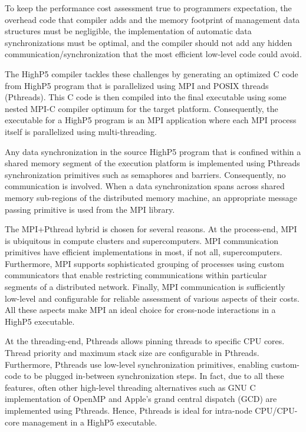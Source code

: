 \documentclass[ASNA,twocolumn]{USG} %
\begin{document}
{To keep the performance cost assessment true to programmers expectation, the overhead code that compiler adds and the memory footprint of management data structures must be negligible, the implementation of automatic data synchronizations must be optimal, and the compiler should not add any hidden communication/synchronization that the most efficient low-level code could avoid. 

The HighP5 compiler tackles these challenges by generating an optimized C code from HighP5 program that is parallelized using MPI and POSIX threads (Pthreads). This C code is then compiled into the final executable using some nested MPI-C compiler optimum for the target platform. Consequently, the executable for a HighP5 program is an MPI application where each MPI process itself is parallelized using multi-threading. 

Any data synchronization in the source HighP5 program that is confined within a shared memory segment of the execution platform is implemented using Pthreads synchronization primitives such as semaphores and barriers. Consequently, no communication is involved. When a data synchronization spans across shared memory sub-regions of the distributed memory machine, an appropriate message passing primitive is used from the MPI library.

{\color{red}
The MPI+Pthread hybrid is chosen for several reasons. At the process-end, MPI is ubiquitous in compute clusters and supercomputers. MPI communication primitives have efficient implementations in most, if not all, supercomputers. Furthermore, MPI supports sophisticated grouping of processes using custom communicators that enable restricting communications within particular segments of a distributed network. Finally, MPI communication is sufficiently low-level and configurable for reliable assessment of various aspects of their costs. All these aspects make MPI an ideal choice for cross-node interactions in a HighP5 executable.

At the threading-end, Pthreads allows pinning threads to specific CPU cores. Thread priority and maximum stack size are configurable in Pthreads. Furthermore, Pthreads use low-level synchronization primitives, enabling custom-code to be plugged in-between synchronization steps. In fact, due to all these features, often other high-level threading alternatives such as GNU C implementation of OpenMP and Apple's grand central dispatch (GCD) \citep{Sakamoto2012} are implemented using Pthreads. Hence, Pthreads is ideal for intra-node CPU/CPU-core management in a HighP5 executable.
}

}
\end{document}
